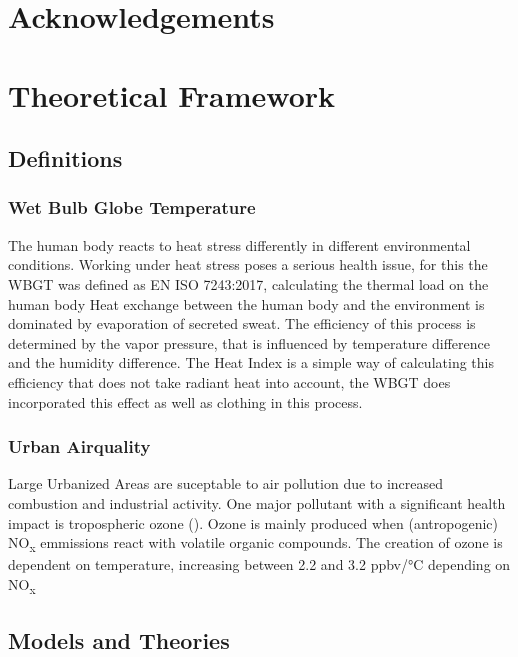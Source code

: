 \documentclass[a4paper, english]{article}
\begin{document}
   

\section*{Acknowledgements}

\section{Theoretical Framework}
    \subsection{Definitions}
    
    \subsubsection{Wet Bulb Globe Temperature}
    The human body reacts to heat stress differently in different environmental conditions. 
    Working under heat stress poses a serious health issue, for this the \gls{WBGT} was defined as EN ISO 7243:2017, calculating the thermal load on the human body\cite{14001700}
    Heat exchange between the human body and the environment is dominated by evaporation of secreted sweat.
    The efficiency of this process is determined by the vapor pressure, that is influenced by temperature difference and the humidity difference. %
    The Heat Index is a simple way of calculating this efficiency that does not take radiant heat into account, the WBGT does incorporated this effect as well as clothing in this process. 

    \subsubsection{Urban Airquality}
    Large Urbanized Areas are suceptable to air pollution due to increased combustion and industrial activity. %
    One major pollutant with a significant health impact is tropospheric ozone (\cite{Ebi2008}). 
    Ozone is mainly produced when (antropogenic) NO\textsubscript{x} emmissions react with volatile organic compounds. %
    The creation of ozone is dependent on temperature, increasing between 2.2 and 3.2 ppbv/°C depending on NO\textsubscript{x}

    \subsection{Models and Theories}
\end{document}
